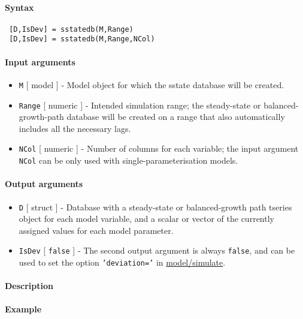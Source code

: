 


	\paragraph{Syntax}
 
 \begin{verbatim}
 [D,IsDev] = sstatedb(M,Range)
 [D,IsDev] = sstatedb(M,Range,NCol)
 \end{verbatim}
 
 \paragraph{Input arguments}
 
 \begin{itemize}
 \item
   \texttt{M} {[} model {]} - Model object for which the sstate database
   will be created.
 \item
   \texttt{Range} {[} numeric {]} - Intended simulation range; the
   steady-state or balanced-growth-path database will be created on a
   range that also automatically includes all the necessary lags.
 \item
   \texttt{NCol} {[} numeric {]} - Number of columns for each variable;
   the input argument \texttt{NCol} can be only used with
   single-parameterisation models.
 \end{itemize}
 
 \paragraph{Output arguments}
 
 \begin{itemize}
 \item
   \texttt{D} {[} struct {]} - Database with a steady-state or
   balanced-growth path tseries object for each model variable, and a
   scalar or vector of the currently assigned values for each model
   parameter.
 \item
   \texttt{IsDev} {[} \texttt{false} {]} - The second output argument is
   always \texttt{false}, and can be used to set the option
   \texttt{'deviation='} in \url{model/simulate}.
 \end{itemize}
 
 \paragraph{Description}
 
 \paragraph{Example}


